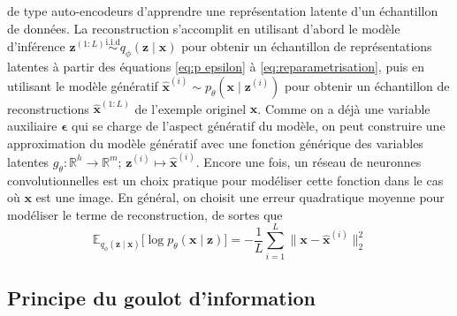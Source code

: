 de type auto-encodeurs d'apprendre une représentation latente d'un échantillon de données.
La reconstruction s'accomplit en utilisant d'abord le modèle d'inférence 
$\mathbf{z}^{(1:L)} \overset{\mathrm{i.i.d}}{\sim} q_\phi(\mathbf{z} \mid \mathbf{x})$ 
pour obtenir un échantillon de représentations latentes à partir des équations \eqref{eq:p epsilon} à \eqref{eq:reparametrisation}, 
puis en utilisant le modèle génératif $\hat{\mathbf{x}}^{(i)} \sim p_\theta(\mathbf{x} \mid \mathbf{z}^{(i)})$ pour obtenir 
un échantillon de reconstructions $\mathbf{\hat{x}}^{(1:L)}$ de l'exemple originel $\mathbf{\mathbf{x}}$. 
Comme on a déjà une variable auxiliaire $\boldsymbol{ \epsilon} $ 
qui se charge de l'aspect génératif du modèle, on peut construire une approximation du 
modèle génératif avec une fonction générique des variables latentes 
${g_\theta: \mathbb{R}^{h} \rightarrow \mathbb{R}^{m};\, \mathbf{z}^{(i)} \mapsto \hat{\mathbf{x}}^{(i)}}$.
Encore une fois, un réseau de neuronnes convolutionnelles est un choix pratique pour modéliser cette fonction 
dans le cas où $\mathbf{x}$ est une image. En général, on choisit une erreur quadratique moyenne pour modéliser le terme de reconstruction, 
de sortes que
\begin{equation}\label{eq:reconstruction}
        \mathbb{E}_{q_\phi(\mathbf{z} \mid \mathbf{x})} \bigg[
                \log p_\theta(\mathbf{x} \mid \mathbf{z})
        \bigg] 
        = -\frac{1}{L}\sum_{i=1}^{L} \lVert \mathbf{x} - \hat{\mathbf{x}}^{(i)} \rVert_2^{2}
\end{equation} 

\subsection{Principe du goulot d'information}

